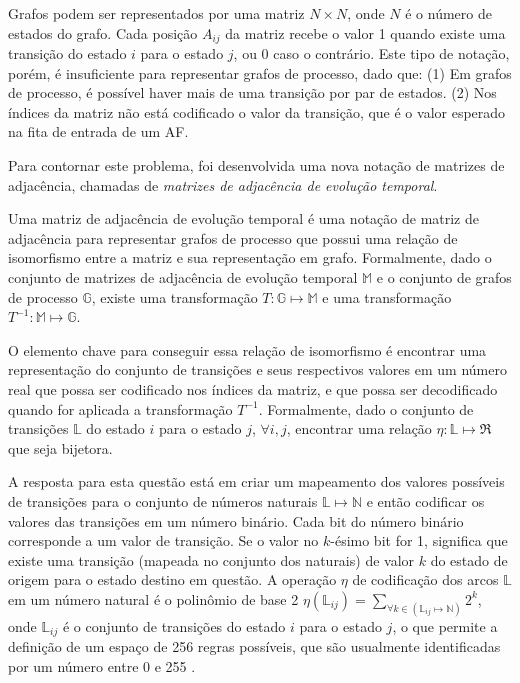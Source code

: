 \documentclass[a4,11pt]{article}
\begin{document}
Grafos podem ser representados por uma matriz $N \times N$, onde $N$
é o número de estados do grafo. Cada posição $A_{ij}$ da matriz recebe o valor
1 quando existe uma transição do estado $i$ para o estado $j$, ou 0 caso o
contrário. Este tipo de notação, porém, é insuficiente para representar grafos
de processo, dado que: (1) Em grafos de processo, é possível haver mais de
uma transição por par de estados. (2) Nos índices da matriz não está
codificado o valor da transição, que é o valor esperado na fita de
entrada de um AF.

Para contornar este problema, foi desenvolvida uma nova notação de matrizes de adjacência,
chamadas de \textit{matrizes de adjacência de evolução temporal}.

Uma matriz de adjacência de evolução temporal é uma notação de matriz de
adjacência para representar grafos de processo que possui uma relação
de isomorfismo entre a matriz e sua representação em grafo.
Formalmente, dado o conjunto de matrizes de adjacência
de evolução temporal $\mathbb{M}$ e o conjunto de grafos de processo $\mathbb{G}$,
existe uma transformação $T: \mathbb{G} \mapsto \mathbb{M}$ e uma
transformação $T^{-1}: \mathbb{M} \mapsto \mathbb{G}$. 

O elemento chave para conseguir essa relação de isomorfismo
é encontrar uma representação do conjunto de transições e
seus respectivos valores em um número real que possa ser codificado
nos índices da matriz, e que possa ser decodificado quando for
aplicada a transformação $T^{-1}$. Formalmente, dado o conjunto de transições
$\mathbb{L}$ do estado $i$ para o estado $j$, $\forall i,j$, encontrar uma
relação $\eta:\mathbb{L} \mapsto \Re$ que seja bijetora.

A resposta para esta questão está em criar um mapeamento dos valores
possíveis de transições para o conjunto de números naturais
$\mathbb{L} \mapsto \mathbb{N}$ e então codificar os valores das transições
em um número binário. Cada bit do número binário corresponde a um valor de
transição. Se o valor no $k$-ésimo bit for 1, significa que existe uma
transição (mapeada no conjunto dos naturais) de valor $k$ do estado de
origem para o estado destino em questão. A operação $\eta$ de codificação dos
arcos $\mathbb{L}$ em um número natural é o polinômio de base 2
$\eta(\mathbb{L}_{ij}) = \sum_{\forall k \in (\mathbb{L}_{ij} \mapsto \mathbb{N})} 2^k$,
onde $\mathbb{L}_{ij}$ é o conjunto de transições do estado $i$ para o estado $j$,
o que permite a definição de um espaço de 256 regras possíveis, que são usualmente
identificadas por um número entre 0 e 255 \cite{wolfram1984}.
\end{document}
